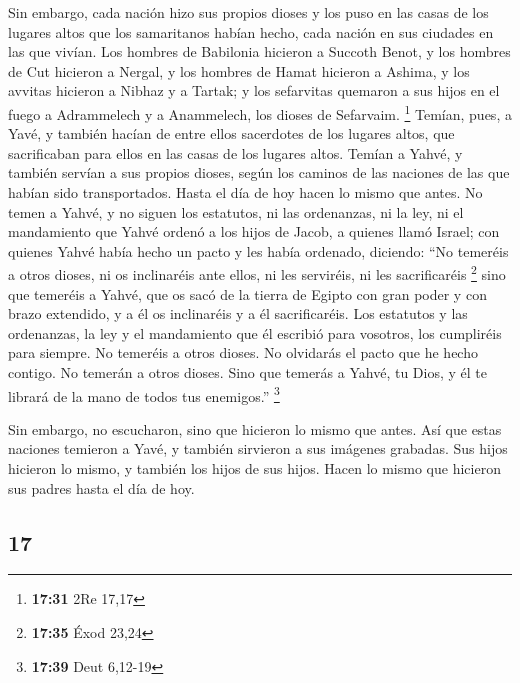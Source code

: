 \begin{paracol}{2}
 Sin embargo, cada nación hizo sus propios dioses y los
puso en las casas de los lugares altos que los samaritanos habían hecho,
cada nación en sus ciudades en las que vivían.  Los
hombres de Babilonia hicieron a Succoth Benot, y los hombres de Cut
hicieron a Nergal, y los hombres de Hamat hicieron a Ashima,
 y los avvitas hicieron a Nibhaz y a Tartak; y los
sefarvitas quemaron a sus hijos en el fuego a Adrammelech y a
Anammelech, los dioses de Sefarvaim. \footnote{\textbf{17:31} 2Re 17,17}
 Temían, pues, a Yavé, y también hacían de entre ellos
sacerdotes de los lugares altos, que sacrificaban para ellos en las
casas de los lugares altos.  Temían a Yahvé, y también
servían a sus propios dioses, según los caminos de las naciones de las
que habían sido transportados.  Hasta el día de hoy hacen
lo mismo que antes. No temen a Yahvé, y no siguen los estatutos, ni las
ordenanzas, ni la ley, ni el mandamiento que Yahvé ordenó a los hijos de
Jacob, a quienes llamó Israel;  con quienes Yahvé había
hecho un pacto y les había ordenado, diciendo: ``No temeréis a otros
dioses, ni os inclinaréis ante ellos, ni les serviréis, ni les
sacrificaréis \footnote{\textbf{17:35} Éxod 23,24}  sino
que temeréis a Yahvé, que os sacó de la tierra de Egipto con gran poder
y con brazo extendido, y a él os inclinaréis y a él sacrificaréis.
 Los estatutos y las ordenanzas, la ley y el mandamiento
que él escribió para vosotros, los cumpliréis para siempre. No temeréis
a otros dioses.  No olvidarás el pacto que he hecho
contigo. No temerán a otros dioses.  Sino que temerás a
Yahvé, tu Dios, y él te librará de la mano de todos tus enemigos.''
\footnote{\textbf{17:39} Deut 6,12-19}

 Sin embargo, no escucharon, sino que hicieron lo mismo
que antes.  Así que estas naciones temieron a Yavé, y
también sirvieron a sus imágenes grabadas. Sus hijos hicieron lo mismo,
y también los hijos de sus hijos. Hacen lo mismo que hicieron sus padres
hasta el día de hoy.

\switchcolumn
\begin{otherlanguage}{english}

\hypertarget{section-33}{%
\section{17}\label{section-33}}


\end{otherlanguage}
\end{paracol}
